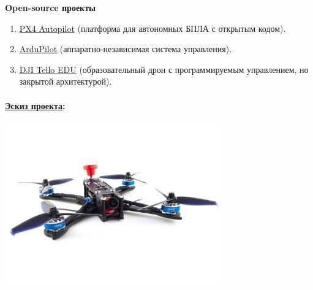 \documentclass[a4paper,12pt]{article} %
\begin{document}
\textbf{Open-source проекты}
\begin{enumerate}
    \item \href{https://px4.io}{PX4 Autopilot} (платформа для автономных БПЛА с открытым кодом).
    \item \href{https://ardupilot.org}{ArduPilot} (аппаратно-независимая система управления).
    \item \href{https://www.dji.com/ru}{DJI Tello EDU} (образовательный дрон с программируемым управлением, но закрытой архитектурой).
\end{enumerate}

\paragraph{\underline{Эскиз проекта}:}
\begin{center}
    \includegraphics[width=0.7\textwidth]{img/drone.jpg} \\
\end{center}
\end{document}
